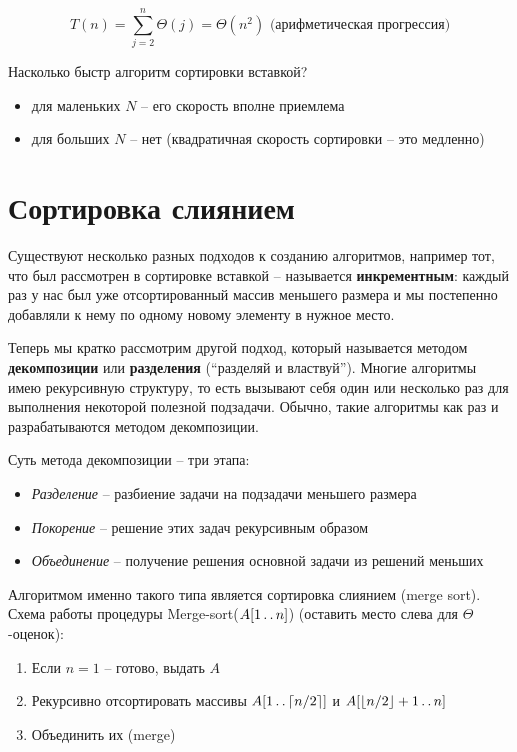 \documentclass[a4paper,11pt]{article}
\begin{document}
\begin{equation*}
  T(n) = \sum_{j=2}^n{\Theta(j)} = \Theta(n^2) \text{ (арифметическая прогрессия)}
\end{equation*}

Насколько быстр алгоритм сортировки вставкой? 
\begin{itemize}
\item для маленьких $N$ -- его скорость вполне приемлема
\item для больших $N$ -- нет (квадратичная скорость сортировки -- это медленно)
\end{itemize}

\section{Сортировка слиянием}

Существуют несколько разных подходов к созданию алгоритмов, например тот, что
был рассмотрен в сортировке вставкой -- называется \textbf{инкрементным}: каждый
раз у нас был уже отсортированный массив меньшего размера и мы постепенно
добавляли к нему по одному новому элементу в нужное место.

Теперь мы кратко рассмотрим другой подход, который называется методом
\textbf{декомпозиции} или \textbf{разделения} (``разделяй и властвуй''). Многие
алгоритмы имею рекурсивную структуру, то есть вызывают себя один или несколько
раз для выполнения некоторой полезной подзадачи. Обычно, такие алгоритмы как раз
и разрабатываются методом декомпозиции.

Суть метода декомпозиции -- три этапа:
\begin{itemize}
\item \emph{Разделение} -- разбиение задачи на подзадачи меньшего размера
\item \emph{Покорение} -- решение этих задач рекурсивным образом
\item \emph{Объединение} -- получение решения основной задачи из решений меньших
\end{itemize}

Алгоритмом именно такого типа является сортировка слиянием (merge sort). Схема
работы процедуры Merge-sort($A[1 \mathinner{\ldotp\ldotp} n]$) (оставить место слева для
$\Theta$-оценок):

\begin{enumerate}
\item Если $n = 1$ -- готово, выдать $A$
\item Рекурсивно отсортировать массивы $A[1 \mathinner{\ldotp\ldotp} \lceil n/2 \rceil]$ и $A[\lfloor
  n/2 \rfloor+1 \mathinner{\ldotp\ldotp} n]$
\item Объединить их (merge)
\end{enumerate}
\end{document}
